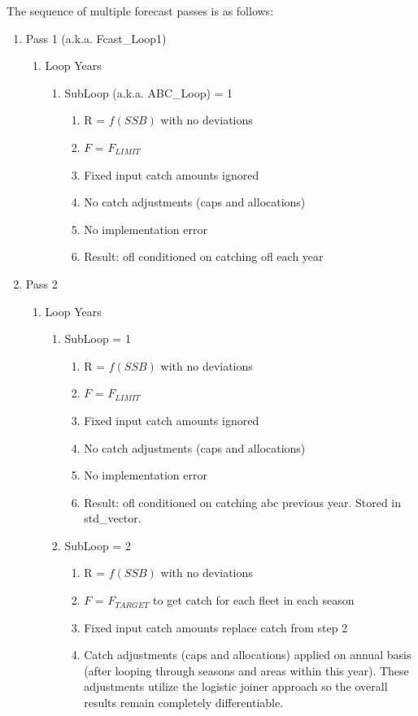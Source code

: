 The sequence of multiple forecast passes is as follows:
\begin{enumerate}
	\item Pass 1 (a.k.a. Fcast\_Loop1)
	\begin{enumerate}
		\item Loop Years
		\begin{enumerate}
			\item SubLoop (a.k.a. ABC\_Loop) = 1
			\begin{enumerate}
				\item R = $f(SSB)$ with no deviations
				\item $F$ = $F_{LIMIT}$
				\item Fixed input catch amounts ignored
				\item No catch adjustments (caps and allocations)
				\item No implementation error
				\item Result: \gls{ofl} conditioned on catching \gls{ofl} each year
			\end{enumerate}
		\end{enumerate}
	\end{enumerate}
	\item Pass 2
	\begin{enumerate}
		\item Loop Years
		\begin{enumerate}
			\item SubLoop = 1
			\begin{enumerate}
				\item R = $f(SSB)$ with no deviations
				\item $F$ = $F_{LIMIT}$
				\item Fixed input catch amounts ignored
				\item No catch adjustments (caps and allocations)
				\item No implementation error
				\item Result: \gls{ofl} conditioned on catching \gls{abc} previous year. Stored in std\_vector.
			\end{enumerate}
			\item SubLoop = 2
			\begin{enumerate}
				\item R = $f(SSB)$ with no deviations
				\item $F$ = $F_{TARGET}$ to get catch for each fleet in each season
				\item Fixed input catch amounts replace catch from step 2
				\item Catch adjustments (caps and allocations) applied on annual basis (after looping through seasons and areas within this year). These adjustments utilize the logistic joiner approach so the overall results remain completely differentiable.

\end{enumerate}
\end{enumerate}
\end{enumerate}
\end{enumerate}
